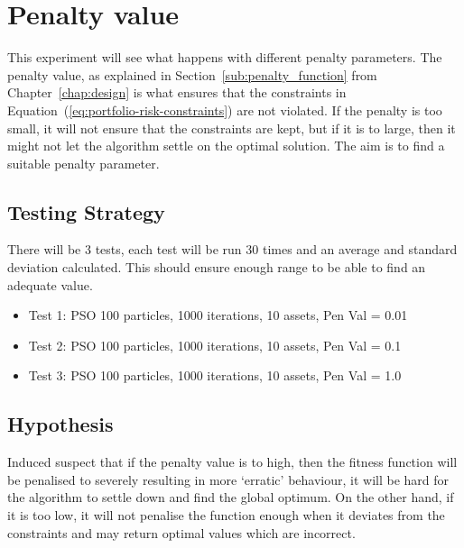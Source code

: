 
  \section{Penalty value} %
  \label{sec:penalty_value}
  This experiment will see what happens with different penalty parameters. The penalty value, as explained in Section~\ref{sub:penalty_function} from Chapter~\ref{chap:design} is what ensures that the constraints in Equation~(\ref{eq:portfolio-risk-constraints}) are not violated. If the penalty is too small, it will not ensure that the constraints are kept, but if it is to large, then it might not let the algorithm settle on the optimal solution. The aim is to find a suitable penalty parameter. 

    \subsection{Testing Strategy}
      There will be 3 tests, each test will be run 30 times and an average and standard deviation calculated. This should ensure enough range to be able to find an adequate value.
      \begin{itemize}
        \item Test 1: PSO 100 particles, 1000 iterations, 10 assets, Pen Val = 0.01
        \item Test 2: PSO 100 particles, 1000 iterations, 10 assets, Pen Val = 0.1
        \item Test 3: PSO 100 particles, 1000 iterations, 10 assets, Pen Val = 1.0
      \end{itemize}

    \subsection{Hypothesis}
    Induced suspect that if the penalty value is to high, then the fitness function will be penalised to severely resulting in more `erratic' behaviour, it will be hard for the algorithm to settle down and find the global optimum. On the other hand, if it is too low, it will not penalise the function enough when it deviates from the constraints and may return optimal values which are incorrect. 

